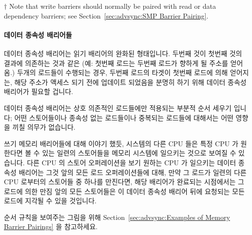 \begin{enumerate}
$\dagger$ Note that write barriers should normally be paired with read
or data dependency barriers; see
Section~\ref{sec:advsync:SMP Barrier Pairing}.
\fi

\paragraph{데이터 종속성 배리어들}

데이터 종속성 배리어는 읽기 배리어의 완화된 형태입니다.
두번째 것이 첫번째 것의 결과에 의존하는 것과 같은 (예: 첫번째 로드는 두번째
로드가 향하게 될 주소를 얻어옴.) 두개의 로드들이 수행되는 경우, 두번째 로드의
타겟이 첫번째 로드에 의해 얻어지는, 해당 주소가 액세스 되기 전에 업데이트
되었음을 분명히 하기 위해 데이터 종속성 배리어가 필요할 겁니다.

데이터 종속성 배리어는 상호 의존적인 로드들에만 적용되는 부분적 순서 세우기
입니다; 어떤 스토어들이나 종속성 없는 로드들이나 중복되는 로드들에 대해서는
어떤 영향을 끼칠 의무가 없습니다.

쓰기 메모리 배리어들에 대해 이야기 했듯, 시스템의 다른 CPU 들은 특정 CPU 가
원한다면 볼 수 있는 일련의 스토어들을 메모리 시스템에 일으키는 것으로 보여질 수
있습니다.
다른 CPU 의 스토어 오퍼레이션을 보기 원하는 CPU 가 일으키는 데이터 종속성
배리어는 그것 앞의 모든 로드 오퍼레이션들에 대해, 만약 그 로드가 일련의 다른
CPU 로부터의 스토어들 중 하나를 만진다면, 해당 배리어가 완료되는 시점에서는 그
로드에 의한 만짐 앞의 모든 스토어들은 이 데이터 종속성 배리어 뒤에 요청되는
모든 로드에 지각될 수 있을 것입니다.

순서 규칙을 보여주는 그림을 위해 Section~\ref{sec:advsync:Examples of Memory
Barrier Pairings} 을 참고하세요.


\end{enumerate}

